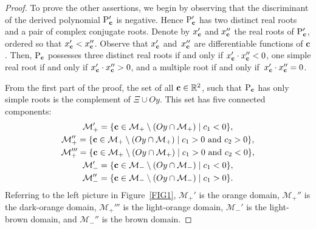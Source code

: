 \documentclass[10pt,a4paper]{amsart}
\numberwithin{equation}{section}
\def\R{\mathbb{R}}
\begin{document}
\begin{proof}
To prove the other assertions, we begin by observing that the discriminant of the derived polynomial ${\rm P}'_{{\bf c}}$
is negative. Hence
${\rm P}'_{{\bf c}}$ has two distinct real roots and a pair of complex conjugate roots.
Denote by $x'_{{\bf c}}$ and $x''_{{\bf c}}$ the real roots of ${\rm P}'_{{\bf c}}$,
ordered so that
$x'_{{\bf c}}<x''_{{\bf c}}$. Observe that $x'_{{\bf c}}$ and~$x''_{{\bf c}}$ are differentiable functions of $\textbf{c}$.
Then, ${\rm P}_{{\bf c}}$ possesses three distinct real roots if and only if $x'_{{\bf c}}\cdot x''_{{\bf c}}<0$,
one simple real root if and only if $x'_{{\bf c}}\cdot x''_{{\bf c}}>0$,
and a multiple root if and only if~$x'_{{\bf c}}\cdot x''_{{\bf c}}=0$.

From the first part of the proof, the set of all ${\bf c}\in \R^2$, such that ${\rm P}_{{\bf c}}$ has only simple roots
is the complement of $\Xi\cup Oy$. This set has five connected components:
%
%
%
\begin{gather}
{\mathcal M}_+' =  \{{\bf c}\in {\mathcal M}_+\setminus (Oy\cap {\mathcal M}_+ ) \mid c_1<0  \}, \nonumber \\
{\mathcal M}_+'' = \{{\bf c}\in {\mathcal M}_+\setminus (Oy\cap {\mathcal M}_+) \mid c_1>0\  \text{and}\  c_2>0  \}, \nonumber \\
{\mathcal M}_+''' = \{{\bf c}\in{\mathcal M}_+\setminus (Oy\cap {\mathcal M}_+) \mid c_1>0\ \text{and}\  c_2<0  \}, \nonumber \\
{\mathcal M}_-' = \{{\bf c}\in {\mathcal M}_-\setminus (Oy\cap {\mathcal M}_-) \mid c_1<0  \}, \nonumber \\
{\mathcal M}_-'' = \{{\bf c}\in {\mathcal M}_-\setminus (Oy\cap {\mathcal M}_-) \mid c_1>0  \}.\label{connectedcomponents}
 \end{gather}
Referring to
the left picture in Figure~\ref{FIG1}, ${\mathcal M}_+'$ is the orange domain, ${\mathcal M}_+''$ is the dark-orange domain,
${\mathcal M}_+'''$ is the light-orange domain, ${\mathcal M}_-'$ is the light-brown domain, and ${\mathcal M}_-''$ is the brown domain.


\end{proof}
\end{document}
